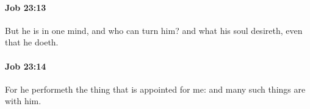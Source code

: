 		\paragraph{Job 23:13} %
			\label{JOB-23-13}

			But he is in one mind, and who can turn him? and what his soul desireth, even that he doeth.


		\paragraph{Job 23:14} %
			\label{JOB-23-14}

			For he performeth the thing that is appointed for me: and many such things are with him.


